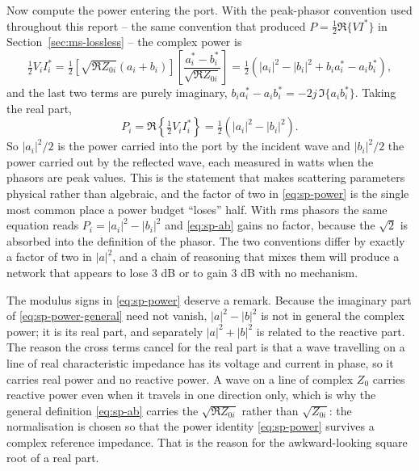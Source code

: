 Now compute the power entering the port. With the peak-phasor convention used throughout this report -- the same
convention that produced $P=\tfrac12\Re\{VI^*\}$ in Section~\ref{sec:ms-lossless} -- the complex power is
\begin{equation}
  \tfrac12 V_i I_i^{*}
  = \tfrac12\left[\sqrt{\Re Z_{0i}}(a_i+b_i)\right]
            \left[\frac{a_i^*-b_i^*}{\sqrt{\Re Z_{0i}}}\right]
  = \tfrac12\left(|a_i|^2 - |b_i|^2 + b_i a_i^* - a_i b_i^*\right),
  \label{eq:sp-power-general}
\end{equation}
and the last two terms are purely imaginary, $b_ia_i^*-a_ib_i^* = -2j\,\Im\{a_ib_i^*\}$. Taking the real part,
\begin{equation}
  P_i = \Re\left\{\tfrac12 V_i I_i^*\right\} = \tfrac12\left(|a_i|^2 - |b_i|^2\right) .
  \label{eq:sp-power}
\end{equation}
So $|a_i|^2/2$ is the power carried into the port by the incident wave and $|b_i|^2/2$ the power carried out by
the reflected wave, each measured in watts when the phasors are peak values. This is the statement that makes
scattering parameters physical rather than algebraic, and the factor of two in \eqref{eq:sp-power} is the single
most common place a power budget ``loses'' half. With rms phasors the same equation reads $P_i=|a_i|^2-|b_i|^2$
and \eqref{eq:sp-ab} gains no factor, because the $\sqrt{2}$ is absorbed into the definition of the phasor. The
two conventions differ by exactly a factor of two in $|a|^2$, and a chain of reasoning that mixes them will
produce a network that appears to lose 3 dB or to gain 3 dB with no mechanism.

The modulus signs in \eqref{eq:sp-power} deserve a remark. Because the imaginary part of \eqref{eq:sp-power-general}
need not vanish, $|a|^2-|b|^2$ is not in general the complex power; it is its real part, and separately
$|a|^2+|b|^2$ is related to the reactive part. The reason the cross terms cancel for the real part is that a
wave travelling on a line of real characteristic impedance has its voltage and current in phase, so it carries
real power and no reactive power. A wave on a line of complex $Z_0$ carries reactive power even when it travels
in one direction only, which is why the general definition \eqref{eq:sp-ab} carries the $\sqrt{\Re Z_{0i}}$ rather
than $\sqrt{Z_{0i}}$: the normalisation is chosen so that the power identity \eqref{eq:sp-power} survives a
complex reference impedance. That is the reason for the awkward-looking square root of a real part.

